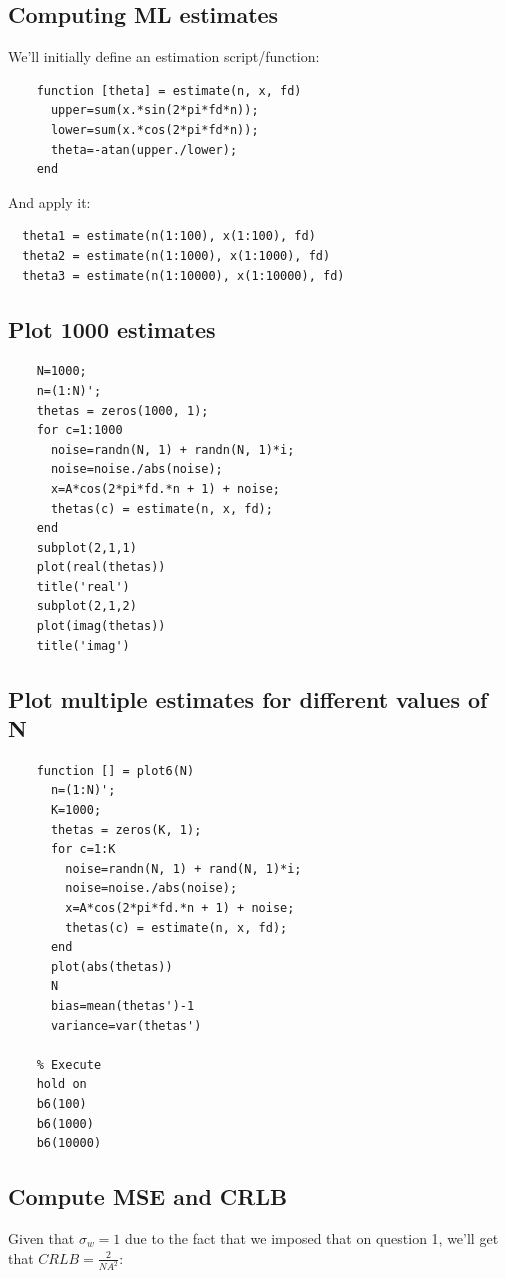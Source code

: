\documentclass[conference,9pt]{IEEEtran}
\begin{document}
\subsection{Computing ML estimates}
We'll initially define an estimation script/function:
\begin{verbatim}
    function [theta] = estimate(n, x, fd)
      upper=sum(x.*sin(2*pi*fd*n));
      lower=sum(x.*cos(2*pi*fd*n));
      theta=-atan(upper./lower);
    end
\end{verbatim}

And apply it:

\begin{verbatim}
  theta1 = estimate(n(1:100), x(1:100), fd)
  theta2 = estimate(n(1:1000), x(1:1000), fd)
  theta3 = estimate(n(1:10000), x(1:10000), fd)
\end{verbatim}

\subsection{Plot 1000 estimates}

\begin{verbatim}
    N=1000;
    n=(1:N)';
    thetas = zeros(1000, 1);
    for c=1:1000
      noise=randn(N, 1) + randn(N, 1)*i;
      noise=noise./abs(noise);
      x=A*cos(2*pi*fd.*n + 1) + noise;
      thetas(c) = estimate(n, x, fd);
    end
    subplot(2,1,1)
    plot(real(thetas))
    title('real')
    subplot(2,1,2)
    plot(imag(thetas))
    title('imag')
  \end{verbatim}

\subsection{Plot multiple estimates for different values of N}

\begin{verbatim}
    function [] = plot6(N)
      n=(1:N)';
      K=1000;
      thetas = zeros(K, 1);
      for c=1:K
        noise=randn(N, 1) + rand(N, 1)*i;
        noise=noise./abs(noise);
        x=A*cos(2*pi*fd.*n + 1) + noise;
        thetas(c) = estimate(n, x, fd);
      end
      plot(abs(thetas))
      N
      bias=mean(thetas')-1
      variance=var(thetas')
    
    % Execute
    hold on
    b6(100)
    b6(1000)
    b6(10000)
    \end{verbatim}

\subsection{Compute MSE and CRLB}
Given that $\sigma_w = 1$ due to the fact that we imposed that on question 1, we'll get that $CRLB=\frac{2}{NA^2}$:
\end{document}
